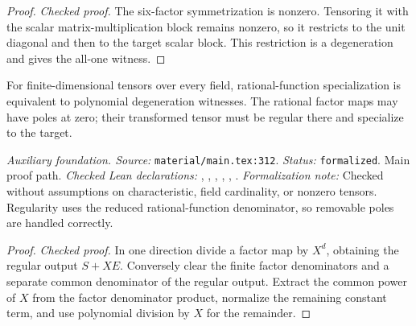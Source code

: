 \begin{proof}
\leanok
{}
\textit{Checked proof.} The six-factor symmetrization is nonzero. Tensoring it with the scalar matrix-multiplication block remains nonzero, so it restricts to the unit diagonal and then to the target scalar block. This restriction is a degeneration and gives the all-one witness.
\end{proof}

\renewcommand{\thetheorem}{A57}
\begin{lemma}
\label{aux:rational-degeneration-equivalence}
\leanok
For finite-dimensional tensors over every field, rational-function specialization is equivalent to polynomial degeneration witnesses. The rational factor maps may have poles at zero; their transformed tensor must be regular there and specialize to the target.
\end{lemma}

\noindent\textit{Auxiliary foundation. Source:} \texttt{material/main.tex:312}.
\textit{Status:} \texttt{formalized}. Main proof path.
\textit{Checked Lean declarations:} , , , , , .
\textit{Formalization note:} Checked without assumptions on characteristic, field cardinality, or nonzero tensors. Regularity uses the reduced rational-function denominator, so removable poles are handled correctly.

\begin{proof}
\leanok
{}
\textit{Checked proof.} In one direction divide a factor map by $X^d$, obtaining the regular output $S+XE$. Conversely clear the finite factor denominators and a separate common denominator of the regular output. Extract the common power of $X$ from the factor denominator product, normalize the remaining constant term, and use polynomial division by $X$ for the remainder.
\end{proof}

